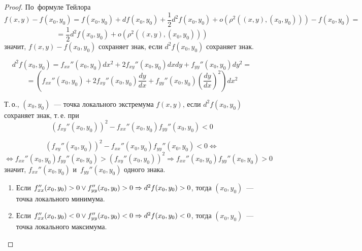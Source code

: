 \begin{proof}
По~формуле Тейлора
\begin{equation*}
f(x, y) - f(x_0, y_0) = f(x_0, y_0) + df(x_0, y_0) + \frac12 d^2f(x_0, y_0) + o(\rho^2((x, y), (x_0, y_0))) - f(x_0, y_0) =
\end{equation*}
\begin{equation*}
= \frac12 d^2f(x_0, y_0) + o(\rho^2((x, y), (x_0, y_0)))
\end{equation*}
значит, $f(x, y) - f(x_0, y_0)$ сохраняет знак, если $d^2f(x_0, y_0)$ сохраняет знак.

\begin{equation*}
d^2f(x_0, y_0) = f_{xx}''(x_0, y_0) dx^2 + 2f_{xy}''(x_0, y_0) dxdy + f_{yy}''(x_0, y_0) dy^2 =
\end{equation*}
\begin{equation*}
= \left(f_{xx}''(x_0, y_0) + 2f_{xy}''(x_0, y_0) \frac{dy}{dx} + f_{yy}''(x_0, y_0) \left(\frac{dy}{dx}\right)^2\right) dx^2
\end{equation*}

Т.\,о., $(x_0, y_0)$~--- точка локального экстремума $f(x, y)$,
если $d^2f(x_0, y_0)$ сохраняет знак, т.\,е. при
\begin{equation*}
(f_{xy}''(x_0, y_0))^2 - f_{xx}''(x_0, y_0) f_{yy}''(x_0, y_0) < 0
\end{equation*}

\begin{equation*}
(f_{xy}''(x_0, y_0))^2 - f_{xx}''(x_0, y_0) f_{yy}''(x_0, y_0) < 0 \Leftrightarrow
\end{equation*}
\begin{equation*}
\Leftrightarrow f_{xx}''(x_0, y_0) f_{yy}''(x_0, y_0) > (f_{xy}''(x_0, y_0))^2 \Rightarrow f_{xx}''(x_0, y_0) f_{yy}''(x_0, y_0) > 0
\end{equation*}
значит, $f_{xx}''(x_0, y_0)$ и~$f_{yy}''(x_0, y_0)$ одного знака.

\begin{enumerate}
	\item Если $f_{xx}''(x_0, y_0) > 0 \lor f_{yy}''(x_0, y_0) > 0 \opbr\Rightarrow d^2f(x_0, y_0) \opbr> 0$, тогда $(x_0, y_0)$~--- точка локального минимума.
	\item Если $f_{xx}''(x_0, y_0) < 0 \lor f_{yy}''(x_0, y_0) < 0 \opbr\Rightarrow d^2f(x_0, y_0) \opbr< 0$, тогда $(x_0, y_0)$~--- точка локального максимума.
\end{enumerate}
\end{proof}

